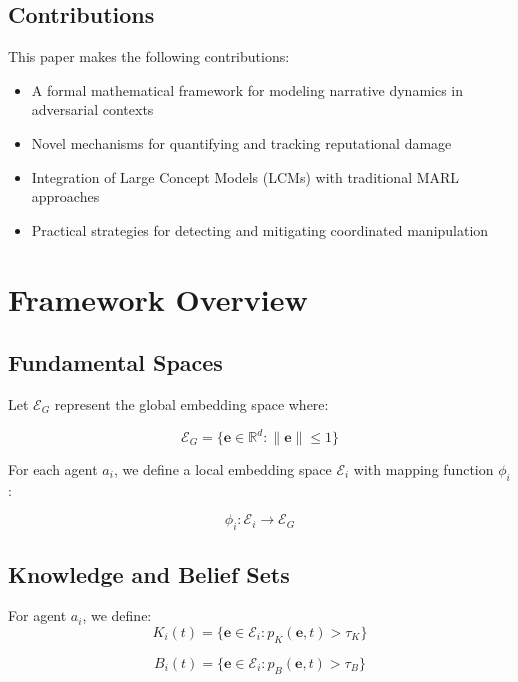 \documentclass[12pt, a4paper]{article}
\begin{document}
\subsection{Contributions}
This paper makes the following contributions:
\begin{itemize}
    \item A formal mathematical framework for modeling narrative dynamics in adversarial contexts
    \item Novel mechanisms for quantifying and tracking reputational damage
    \item Integration of Large Concept Models (LCMs) with traditional MARL approaches
    \item Practical strategies for detecting and mitigating coordinated manipulation
\end{itemize}

\section{Framework Overview}
\subsection{Fundamental Spaces}
Let $\mathcal{E}_G$ represent the global embedding space where:

\begin{equation}
\mathcal{E}_G = \{\mathbf{e} \in \mathbb{R}^d : \|\mathbf{e}\| \leq 1\}
\end{equation}

For each agent $a_i$, we define a local embedding space $\mathcal{E}_i$ with mapping function $\phi_i$:

\begin{equation}
\phi_i: \mathcal{E}_i \rightarrow \mathcal{E}_G
\end{equation}

\subsection{Knowledge and Belief Sets}
For agent $a_i$, we define:
\begin{equation}
K_i(t) = \{\mathbf{e} \in \mathcal{E}_i : p_K(\mathbf{e}, t) > \tau_K\}
\end{equation}

\begin{equation}
B_i(t) = \{\mathbf{e} \in \mathcal{E}_i : p_B(\mathbf{e}, t) > \tau_B\}
\end{equation}
\end{document}
